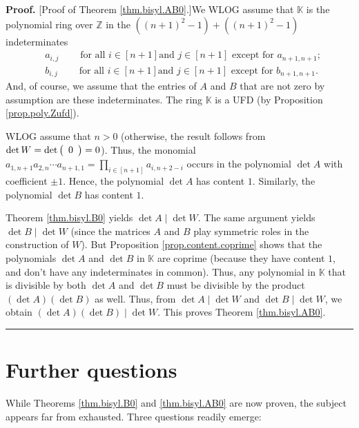 \documentclass[numbers=enddot,12pt,final,onecolumn,notitlepage]{scrartcl}%
\theoremstyle{definition}
\newenvironment{proof}[1][Proof]{\noindent\textbf{#1.} }{\ \rule{0.5em}{0.5em}}
\let\prodnonlimits\prod
\renewcommand{\prod}{\prodnonlimits\limits}
\begin{document}
\begin{proof}
[Proof of Theorem \ref{thm.bisyl.AB0}.]We WLOG assume that $\mathbb{K}$ is the
polynomial ring over $\mathbb{Z}$ in the $\left(  \left(  n+1\right)
^{2}-1\right)  +\left(  \left(  n+1\right)  ^{2}-1\right)  $ indeterminates%
\begin{align*}
&  a_{i,j}\ \ \ \ \ \ \ \ \ \ \text{for all }i\in\left[  n+1\right]  \text{
and }j\in\left[  n+1\right]  \text{ except for }a_{n+1,n+1};\\
&  b_{i,j}\ \ \ \ \ \ \ \ \ \ \text{for all }i\in\left[  n+1\right]  \text{
and }j\in\left[  n+1\right]  \text{ except for }b_{n+1,n+1}.
\end{align*}
And, of course, we assume that the entries of $A$ and $B$ that are not zero by
assumption are these indeterminates. The ring $\mathbb{K}$ is a UFD (by
Proposition \ref{prop.poly.Zufd}).

WLOG assume that $n>0$ (otherwise, the result follows from $\det W=\det\left(
%
\begin{array}
[c]{c}%
0
\end{array}
\right)  =0$). Thus, the monomial $a_{1,n+1}a_{2,n}\cdots a_{n+1,1}%
=\prod_{i\in\left[  n+1\right]  }a_{i,n+2-i}$ occurs in the polynomial $\det
A$ with coefficient $\pm1$. Hence, the polynomial $\det A$ has content $1$.
Similarly, the polynomial $\det B$ has content $1$.

Theorem \ref{thm.bisyl.B0} yields $\det A\mid\det W$. The same argument yields
$\det B\mid\det W$ (since the matrices $A$ and $B$ play symmetric roles in the
construction of $W$). But Proposition \ref{prop.content.coprime} shows that
the polynomials $\det A$ and $\det B$ in $\mathbb{K}$ are coprime (because
they have content $1$, and don't have any indeterminates in common). Thus, any
polynomial in $\mathbb{K}$ that is divisible by both $\det A$ and $\det B$
must be divisible by the product $\left(  \det A\right)  \left(  \det
B\right)  $ as well. Thus, from $\det A\mid\det W$ and $\det B\mid\det W$, we
obtain $\left(  \det A\right)  \left(  \det B\right)  \mid\det W$. This proves
Theorem \ref{thm.bisyl.AB0}.
\end{proof}


\section{Further questions}

While Theorems \ref{thm.bisyl.B0} and \ref{thm.bisyl.AB0} are now proven, the
subject appears far from exhausted. Three questions readily emerge:
\end{document}
